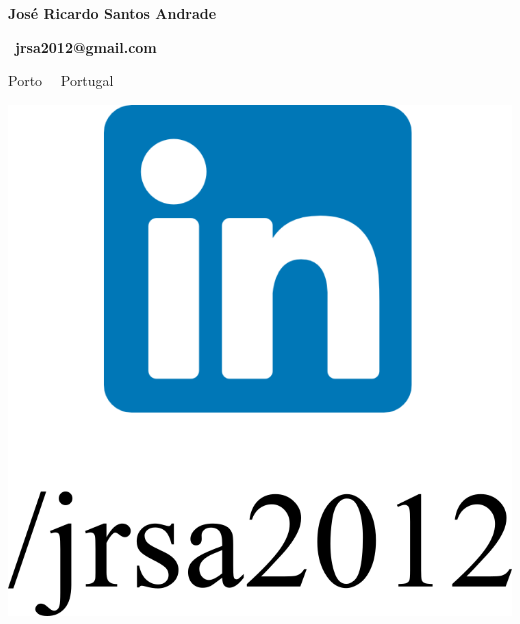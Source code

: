 \documentclass{mycv}
\begin{document}
\begin{center}
	{\LARGE\textbf{José Ricardo Santos Andrade}} \\
	\vspace{0.2cm}	
	
	\ \textbf{jrsa2012@gmail.com}
	
	
	
	\vspace{0.2cm}	
	
		Porto~\textbullet 
	\ Portugal

\end{center}

\begin{center}
	
	\href{https://www.linkedin.com/in/jrsa2012}{\includegraphics[scale=0.06]{figs/linkedin_logo_label.png}}
	\ \ \ \ \ \ \ \ \ \ \

\end{center}
\end{document}
